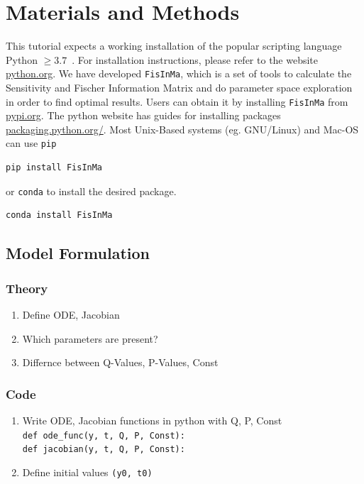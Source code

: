 \documentclass[10pt,A4paper]{article}
\begin{document}
%
%
%
\section*{Materials and Methods}
This tutorial expects a working installation of the popular scripting language Python $\geq3.7$~\cite{rossumPythonLanguageReference2010}.
For installation instructions, please refer to the website \href{https://www.python.org/downloads/}{python.org}.
We have developed \texttt{FisInMa}, which is a set of tools to calculate the Sensitivity and Fischer Information Matrix and do parameter space exploration in order to find optimal results.
Users can obtain it by installing \texttt{FisInMa} from \href{https://pypi.org/project/FisInMa/0.0.1/}{pypi.org}.
The python website has guides for installing packages \href{https://packaging.python.org/en/latest/tutorials/installing-packages/}{packaging.python.org/}.
Most Unix-Based systems (eg. GNU/Linux) and Mac-OS can use \texttt{pip}
\begin{verbatim}
pip install FisInMa
\end{verbatim}
or \texttt{conda} to install the desired package.
\begin{verbatim}
conda install FisInMa
\end{verbatim}
%
%
\subsection*{Model Formulation}
\subsubsection*{Theory}
\begin{enumerate}
    \item Define ODE, Jacobian
    \item Which parameters are present?
    \item Differnce between Q-Values, P-Values, Const
\end{enumerate}
\subsubsection*{Code}
\begin{enumerate}
    \item Write ODE, Jacobian functions in python with Q, P, Const\\
    \texttt{def ode_func(y, t, Q, P, Const):}\\
    \texttt{def jacobian(y, t, Q, P, Const):}
    \item Define initial values \texttt{(y0, t0)}
\end{enumerate}
%
\end{document}
